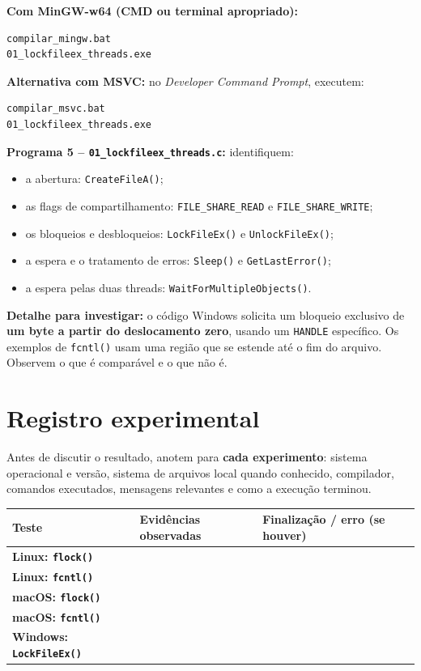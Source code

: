 \documentclass[11pt,a4paper]{article}
\newcommand{\emphbox}[1]{\vspace{2pt}\noindent\colorbox{fundo}{\parbox{\dimexpr\linewidth-2\fboxsep}{#1}}\vspace{2pt}}
\begin{document}
\textbf{Com MinGW-w64 (CMD ou terminal apropriado):}
\begin{lstlisting}[style=terminal]
compilar_mingw.bat
01_lockfileex_threads.exe
\end{lstlisting}
\textbf{Alternativa com MSVC:} no \textit{Developer Command Prompt}, executem:
\begin{lstlisting}[style=terminal]
compilar_msvc.bat
01_lockfileex_threads.exe
\end{lstlisting}

\textbf{Programa 5 -- \texttt{01\_lockfileex\_threads.c}:} identifiquem:
\begin{itemize}
\item a abertura: \texttt{CreateFileA()};
\item as flags de compartilhamento: \texttt{FILE\_SHARE\_READ} e \texttt{FILE\_SHARE\_WRITE};
\item os bloqueios e desbloqueios: \texttt{LockFileEx()} e \texttt{UnlockFileEx()};
\item a espera e o tratamento de erros: \texttt{Sleep()} e \texttt{GetLastError()};
\item a espera pelas duas threads: \texttt{WaitForMultipleObjects()}.
\end{itemize}

\emphbox{\textbf{Detalhe para investigar:} o código Windows solicita um bloqueio exclusivo de \textbf{um byte a partir do deslocamento zero}, usando um \texttt{HANDLE} específico. Os exemplos de \texttt{fcntl()} usam uma região que se estende até o fim do arquivo. Observem o que é comparável e o que não é.}

\section{Registro experimental}
Antes de discutir o resultado, anotem para \textbf{cada experimento}: sistema operacional e versão, sistema de arquivos local quando conhecido, compilador, comandos executados, mensagens relevantes e como a execução terminou.

\begin{tabularx}{\textwidth}{>{\bfseries}p{2.8cm}X X}
\toprule
Teste & Evidências observadas & Finalização / erro (se houver)\\
\midrule
Linux: \texttt{flock()} & \rule{0pt}{1.0cm} & \\
Linux: \texttt{fcntl()} & \rule{0pt}{1.0cm} & \\
macOS: \texttt{flock()} & \rule{0pt}{1.0cm} & \\
macOS: \texttt{fcntl()} & \rule{0pt}{1.0cm} & \\
Windows: \texttt{LockFileEx()} & \rule{0pt}{1.0cm} & \\
\bottomrule
\end{tabularx}
\end{document}
